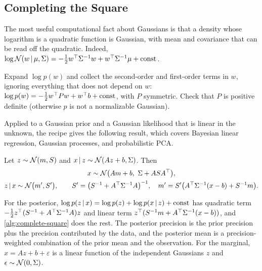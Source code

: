 \subsection{Completing the Square}

The most useful computational fact about Gaussians is that a density whose logarithm is a quadratic function is Gaussian, with mean and covariance that can be read off the quadratic. Indeed, $\log\mathcal{N}(w\,|\,\mu,\Sigma)=-\frac12w^{\top}\Sigma^{-1}w+w^{\top}\Sigma^{-1}\mu+\text{const}$.

\begin{algorithm}[H]
\caption{Identifying a Gaussian by Completing the Square}\label{alg:complete-square}
\begin{algorithmic}[1]
\State Expand $\log p(w)$ and collect the second-order and first-order terms in $w$, ignoring everything that does not depend on $w$:
\Statex \hspace*{2.4em}$\log p(w)=-\frac12w^{\top} Pw+w^{\top} b+\text{const}$, with $P$ symmetric.
\State Check that $P$ is positive definite (otherwise $p$ is not a normalizable Gaussian).
\end{algorithmic}
\end{algorithm}

Applied to a Gaussian prior and a Gaussian likelihood that is linear in the unknown, the recipe gives the following result, which covers Bayesian linear regression, Gaussian processes, and probabilistic PCA.

\begin{proposition}\label{prop:linear-gaussian}
Let $z\sim\mathcal{N}(m,S)$ and $x\,|\, z\sim\mathcal{N}(Az+b,\Sigma)$. Then
\begin{gather*}
x\sim\mathcal{N}\big(Am+b,\ \Sigma+ASA^{\top}\big),\\
z\,|\, x\sim\mathcal{N}\big(m',S'\big),\qquad S'=\big(S^{-1}+A^{\top}\Sigma^{-1}A\big)^{-1},\quad m'=S'\big(A^{\top}\Sigma^{-1}(x-b)+S^{-1}m\big).
\end{gather*}
\end{proposition}

For the posterior, $\log p(z\,|\, x)=\log p(z)+\log p(x\,|\, z)+\text{const}$ has quadratic term $-\frac12z^{\top}(S^{-1}+A^{\top}\Sigma^{-1}A)z$ and linear term $z^{\top}(S^{-1}m+A^{\top}\Sigma^{-1}(x-b))$, and \cref{alg:complete-square} does the rest. The posterior precision is the prior precision plus the precision contributed by the data, and the posterior mean is a precision-weighted combination of the prior mean and the observation. For the marginal, $x=Az+b+\varepsilon$ is a linear function of the independent Gaussians $z$ and $\epsilon\sim\mathcal{N}(0,\Sigma)$.

